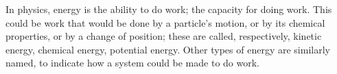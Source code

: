 In physics, energy is the ability to do work; the capacity for doing work.
This could be work that would be done by a particle's motion, or by its
chemical properties, or by a change of position; these are called, respectively,
kinetic energy, chemical energy, potential energy. Other types of energy are 
similarly named, to indicate how a system could be made to do work.